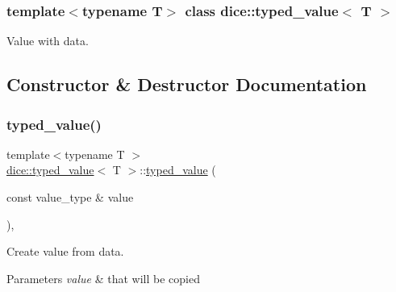 \subsubsection*{template$<$typename T$>$\newline
class dice\+::typed\+\_\+value$<$ T $>$}

Value with data. 

\subsection{Constructor \& Destructor Documentation}
\mbox{\label{classdice_1_1typed__value_a44f8d5dc37013a90d605e67f71741837}} 
\subsubsection{\texorpdfstring{typed\+\_\+value()}{typed\_value()}\hspace{0.1cm}{\footnotesize\ttfamily [1/2]}}
{\footnotesize\ttfamily template$<$typename T $>$ \\
\mbox{\hyperlink{classdice_1_1typed__value}{dice\+::typed\+\_\+value}}$<$ T $>$\+::\mbox{\hyperlink{classdice_1_1typed__value}{typed\+\_\+value}} (\begin{DoxyParamCaption}\item[{const value\+\_\+type \&}]{value }\end{DoxyParamCaption})\hspace{0.3cm}{\ttfamily [inline]}, {\ttfamily [explicit]}}



Create value from data. 


\begin{DoxyParams}{Parameters}
{\em value} & that will be copied \\
\hline
\end{DoxyParams}
\mbox{\label{classdice_1_1typed__value_a7cd2dad2087902ab85028fddf7c75c0b}} 
